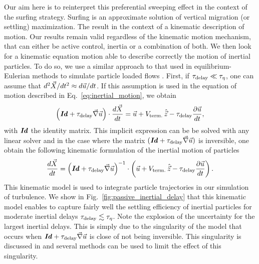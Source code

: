 Our aim here is to reinterpret this preferential sweeping effect in the context of the surfing strategy.
Surfing is an approximate solution of vertical migration (or settling) maximization. 
The result in the context of a kinematic description of motion.
Our results remain valid regardless of the kinematic motion mechanism, that can either be active control, inertia or a combination of both.
We then look for a kinematic equation motion able to describe correctly the motion of inertial particles.
To do so, we use a similar approach to that used in equilibrium-Eulerian methods to simulate particle loaded flows \citep{ferry2001fast, ferry2003locally, balachandar2010turbulent, cerminara2016ashee}.
First, if $\tau_{\mathrm{delay}} \ll \tau_{\eta}$, one can assume that $d^2 \vec{X} / dt^2 \approx d \vec{u} / dt$.
If this assumption is used in the equation of motion described in Eq.~\eqref{eq:inertial_motion}, we obtain
\begin{equation}\label{eq:inertial_motion_kinematic}
	\left( \boldsymbol{\mathit{Id}} + \tau_{\mathrm{delay}} \vec{\nabla} \vec{u} \right) \cdot \frac{d \vec{X}}{dt} = \vec{u} + V_{\mathrm{term.}} \, \hat{\vec{z}} - \tau_{\mathrm{delay}} \frac{\partial \vec{u}}{dt},
\end{equation}
with $\boldsymbol{\mathit{Id}}$ the identity matrix.
This implicit expression can be be solved with any linear solver and in the case where the matrix $( \boldsymbol{\mathit{Id}} + \tau_{\mathrm{delay}} \vec{\nabla} \vec{u})$ is inversible, one obtain the following kinematic formulation of the inertial motion of particles
\begin{equation}\label{eq:inertial_motion_kinematic_inverse}
	 \frac{d \vec{X}}{dt} = \left( \boldsymbol{\mathit{Id}} + \tau_{\mathrm{delay}} \vec{\nabla} \vec{u} \right)^{-1} \cdot \left( \vec{u} + V_{\mathrm{term.}} \, \hat{\vec{z}} - \tau_{\mathrm{delay}} \frac{\partial \vec{u}}{dt} \right).
\end{equation}
This kinematic model is used to integrate particle trajectories in our simulation of turbulence.
We show in Fig.~\ref{fig:passive_inertial_delay} that this kinematic model enables to capture fairly well the settling efficiency of inertial particles for moderate inertial delays $\tau_{\mathrm{delay}} \lesssim \tau_{\eta}$.
Note the explosion of the uncertainty for the largest inertial delays.
This is simply due to the singularity of the model that occurs when $\boldsymbol{\mathit{Id}} + \tau_{\mathrm{delay}} \vec{\nabla} \vec{u}$ is close of not being inversible.
This singularity is discussed in \citet{ferry2001fast} and several methods can be used to limit the effect of this singularity.

